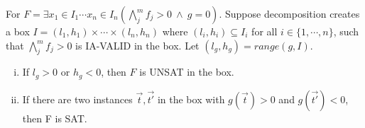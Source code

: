 \documentclass[runningheads,a4paper,oribibl]{llncs}
\begin{document}
\begin{lemma} \label{lemma:ivt}
For $F = \exists x_1 \in I_1 \cdots x_n \in I_n (\bigwedge \limits_{j}^m f_j > 0~\wedge~g = 0)$. Suppose decomposition creates a box $I = (l_1, h_1) \times \cdots \times (l_n, h_n)$ where $(l_i, h_i) \subseteq I_i$ for all $i \in \{1, \cdots, n\}$, such that $\bigwedge \limits_{j}^m f_j > 0$ is IA-VALID in the box. Let $(l_g, h_g) = range(g, I)$.
\begin{enumerate}[(i)]
\item If $l_g > 0$ or $h_g < 0$, then $F$ is UNSAT in the box. 
\item If there are two instances $\vec{t},\vec{t'}$ in the box with $g(\vec{t}) > 0$ and $g(\vec{t'}) < 0$, then F is SAT.
\end{enumerate}
\end{lemma}
\end{document}
